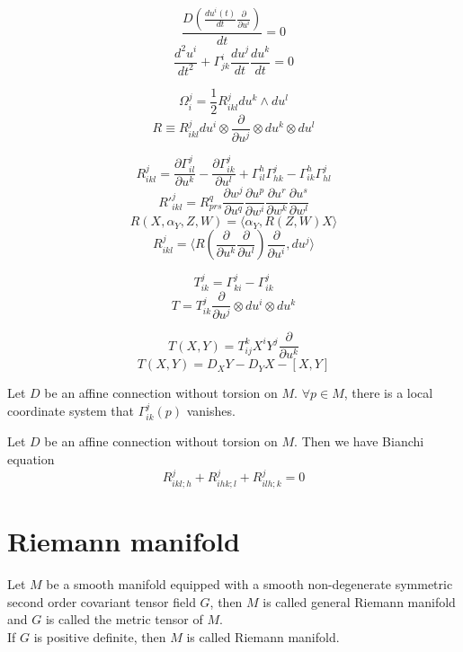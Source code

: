 \begin{newdef}
\[\frac{D(\frac{du^i(t)}{dt} \frac{\partial}{\partial u^i})}{dt} = 0 \]
\[\frac{d^2 u^i}{dt^2} + \Gamma^i_{jk} \frac{du^j}{dt} \frac{du^k}{dt} = 0\]
\end{newdef}

\begin{newdef}
\[\Omega^j_i = \frac{1}{2}R^j_{ikl} du^k \wedge du^l \]
\[R \equiv R^{j}_{ikl} du^{i} \otimes \frac{\partial}{\partial u^j} \otimes du^{k} \otimes du^{l}\]
\end{newdef}

\begin{newprop}
\[R^j_{ikl} = \frac{\partial \Gamma^j_{il}}{\partial u^k} - \frac{\partial \Gamma^j_{ik}}{\partial u^l} + \Gamma^h_{il} \Gamma^j_{hk} - \Gamma^h_{ik} \Gamma^j_{hl}\]
\[R'^j_{ikl} = R^q_{prs} \frac{\partial w^j}{\partial u^q} \frac{\partial u^p}{\partial w^i} \frac{\partial u^r}{\partial w^k}\frac{\partial u^s}{\partial w^l}\]
\[R(X,\alpha_Y,Z,W)= \langle \alpha_Y,R(Z,W)X \rangle\]
\[R^{j}_{ikl} = \langle R(\frac{\partial}{\partial u^k} \frac{\partial}{\partial u^l})\frac{\partial}{\partial u^i},du^j \rangle\]
\end{newprop}


\begin{newdef}
\[T^j_{ik} = \Gamma^j_{ki} - \Gamma^j_{ik}\]
\[T = T^j_{ik} \frac{\partial}{\partial u^j} \otimes du^i \otimes du^k\]
\end{newdef}

\begin{newprop}
\[T(X,Y) = T^k_{ij}X^i Y^j \frac{\partial}{\partial u^k}\]
\[T(X,Y) = D_X Y - D_Y X - [X,Y]\]
\end{newprop}

\begin{newthem}
Let $D$ be an affine connection without torsion on $M$. $\forall p \in M$, there is a local coordinate system that $\Gamma^j_{ik}(p)$ vanishes.
\end{newthem}

\begin{newthem}
Let $D$ be an affine connection without torsion on $M$. Then we have Bianchi equation
\[R^j_{ikl;h} + R^j_{ihk;l} + R^j_{ilh;k} = 0\]
\end{newthem}

\section{Riemann manifold}
\begin{newdef} 
Let $M$ be a smooth manifold equipped with a smooth non-degenerate symmetric second order covariant tensor field $G$, then $M$ is called general Riemann manifold and $G$ is called the metric tensor of $M$.\\
If $G$ is positive definite, then $M$ is called Riemann manifold.
\end{newdef}

